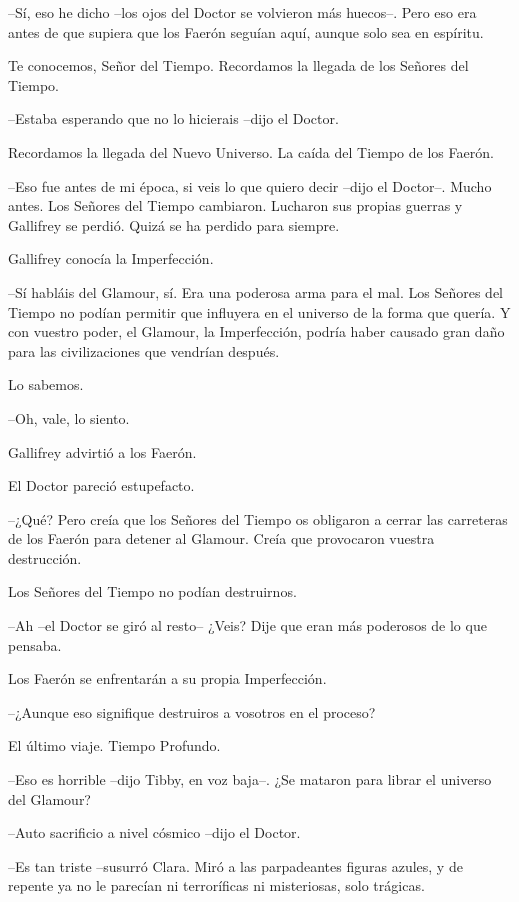 {--Sí, eso he dicho --los ojos del Doctor se volvieron más huecos--. Pero
 eso era antes de que supiera que los Faerón seguían aquí, aunque solo
sea en espíritu.}

{Te conocemos, Señor del Tiempo. Recordamos la llegada de los Señores del
Tiempo.}

{--Estaba esperando que no lo hicierais --dijo el Doctor.}

{Recordamos la llegada del Nuevo Universo. La caída del Tiempo de los
Faerón.}

{--Eso fue antes de mi época, si veis lo que quiero decir --dijo el
 Doctor--. Mucho antes. Los Señores del Tiempo cambiaron. Lucharon sus
 propias guerras y Gallifrey se perdió. Quizá se ha perdido para
siempre.}

{Gallifrey conocía la Imperfección.}

{--Sí habláis del Glamour, sí. Era una poderosa arma para el mal. Los
 Señores del Tiempo no podían permitir que influyera en el universo de la
 forma que quería. Y con vuestro poder, el Glamour, la Imperfección,
 podría haber causado gran daño para las civilizaciones que vendrían
después.}

{Lo sabemos.}

{--Oh, vale, lo siento.}

{Gallifrey advirtió a los Faerón.}

{El Doctor pareció estupefacto.}

{--¿Qué? Pero creía que los Señores del Tiempo os obligaron a cerrar las
 carreteras de los Faerón para detener al Glamour. Creía que provocaron
vuestra destrucción.}

{Los Señores del Tiempo no podían destruirnos.}

{--Ah --el Doctor se giró al resto-- ¿Veis? Dije que eran más poderosos
de lo que pensaba.}

{Los Faerón se enfrentarán a su propia Imperfección.}

{--¿Aunque eso signifique destruiros a vosotros en el proceso?}

{El último viaje. Tiempo Profundo.}

{--Eso es horrible --dijo Tibby, en voz baja--. ¿Se mataron para librar
el universo del Glamour?}

{--Auto sacrificio a nivel cósmico --dijo el Doctor.}

{--Es tan triste --susurró Clara. Miró a las parpadeantes figuras azules,
 y de repente ya no le parecían ni terroríficas ni misteriosas, solo
trágicas.}

